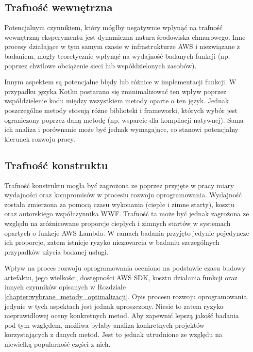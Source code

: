 \subsection*{Trafność wewnętrzna}

Potencjalnym czynnikiem, który mógłby negatywnie wpłynąć na trafność wewnętrzną eksperymentu jest dynamiczna natura środowiska chmurowego.
Inne procesy działające w tym samym czasie w infrastrukturze AWS i niezwiązane z badaniem, mogły teoretycznie wpłynąć na wydajność badanych funkcji (np. poprzez chwilowe obciążenie sieci lub współdzielonych zasobów).

Innym aspektem są potencjalne błędy lub różnice w implementacji funkcji.
W przypadku języka Kotlin postarano się zminimalizować ten wpływ poprzez współdzielenie kodu między wszystkiem metody oparte o ten język.
Jednak poszczególne metody stosują różne biblioteki i frameworki, których wybór jest ograniczony poprzez daną metodę (np. wsparcie dla kompilacji natywnej).
Sama ich analiza i porównanie może być jednak wymagające, co stanowi potencjalny kierunek rozwoju pracy.

\subsection*{Trafność konstruktu}

Trafność konstruktu mogła być zagrożona ze poprzez przyjęte w pracy miary wydajności oraz kompromisów w procesiu rozwoju oprogramowania.
Wydajność została zmierzona za pomocą czasu wykonania (ciepłe i zimne starty), kosztu oraz autorskiego współczynnika WWF.
Trafność ta może być jednak zagrożona ze względu na zróżnicowane proporcje ciepłych i zimnych startów w systemach opartych o funkcje AWS Lambda.
W ramach badania przyjęto jedynie pojedyncze ich proporcje, zatem istnieje ryzyko niezawarcia w badaniu szczególnych przypadków użycia badanej usługi.

Wpływ na proces rozwoju oprogramowania oceniono na podstawie czasu budowy artefaktu, jego wielkości, dostępności AWS SDK, kosztu działania funkcji oraz innych czynników opisanych w Rozdziale \ref{chapter:wybrane_metody_optimalizacji}.
Opis procesu rozwoju oprogramowania jedynie w tych aspektach jest jednak uproszczony.
Niesie to zatem ryzyko nieprawidłowej oceny konkretnych metod.
Aby zapewnić lepszą jakość badania pod tym względem, możliwa byłaby analiza konkretnych projektów korzystających z danych metod.
Jest to jednak utrudnione ze względu na niewielką popularność części z nich.

